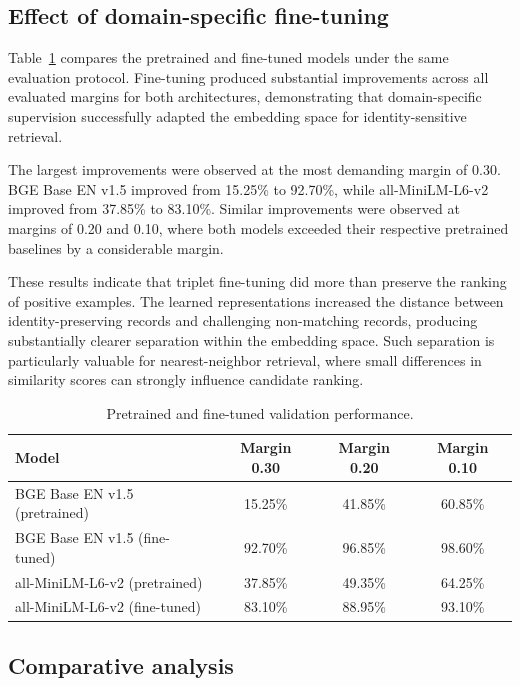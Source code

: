 \documentclass{article}
\begin{document}
\subsection{Effect of domain-specific fine-tuning}

Table~\ref{tab:finetuned} compares the pretrained and fine-tuned models under the same evaluation protocol. Fine-tuning produced substantial improvements across all evaluated margins for both architectures, demonstrating that domain-specific supervision successfully adapted the embedding space for identity-sensitive retrieval.

The largest improvements were observed at the most demanding margin of 0.30. BGE Base EN v1.5 improved from 15.25\% to 92.70\%, while all-MiniLM-L6-v2 improved from 37.85\% to 83.10\%. Similar improvements were observed at margins of 0.20 and 0.10, where both models exceeded their respective pretrained baselines by a considerable margin.

These results indicate that triplet fine-tuning did more than preserve the ranking of positive examples. The learned representations increased the distance between identity-preserving records and challenging non-matching records, producing substantially clearer separation within the embedding space. Such separation is particularly valuable for nearest-neighbor retrieval, where small differences in similarity scores can strongly influence candidate ranking.

\begin{table}[t]
  \caption{Pretrained and fine-tuned validation performance.}
  \label{tab:finetuned}
  \centering
  \begin{tabular}{lccc}
    \toprule
    Model & Margin 0.30 & Margin 0.20 & Margin 0.10 \\
    \midrule
    BGE Base EN v1.5 (pretrained)   & 15.25\% & 41.85\% & 60.85\% \\
    BGE Base EN v1.5 (fine-tuned)   & 92.70\% & 96.85\% & 98.60\% \\
    all-MiniLM-L6-v2 (pretrained)   & 37.85\% & 49.35\% & 64.25\% \\
    all-MiniLM-L6-v2 (fine-tuned)   & 83.10\% & 88.95\% & 93.10\% \\
    \bottomrule
  \end{tabular}
\end{table}

\subsection{Comparative analysis}
\end{document}
